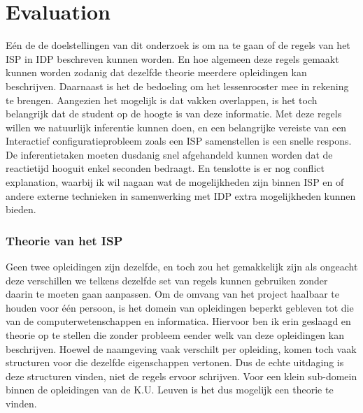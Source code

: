 \chapter{Evaluation}
\label{cha:evaluation}
E\'{e}n de de doelstellingen van dit onderzoek is om na te gaan of de regels van het ISP in IDP beschreven kunnen worden. En hoe algemeen deze regels gemaakt kunnen worden zodanig dat dezelfde theorie meerdere opleidingen kan beschrijven. Daarnaast is het de bedoeling om het lessenrooster mee in rekening te brengen. Aangezien het mogelijk is dat vakken overlappen, is het toch belangrijk dat de student op de hoogte is van deze informatie. Met deze regels willen we natuurlijk inferentie kunnen doen, en een belangrijke vereiste van een Interactief configuratieprobleem zoals een ISP samenstellen is een snelle respons. De inferentietaken moeten dusdanig snel afgehandeld kunnen worden dat de reactietijd hooguit enkel seconden bedraagt. En tenslotte is er nog conflict explanation, waarbij ik wil nagaan wat de mogelijkheden zijn binnen ISP en of andere externe technieken \cite{amilhastre2002consistency} in samenwerking met IDP extra mogelijkheden kunnen bieden. 

\subsection{Theorie van het ISP}
Geen twee opleidingen zijn dezelfde, en toch zou het gemakkelijk zijn als ongeacht deze verschillen we telkens dezelfde set van regels kunnen gebruiken zonder daarin te moeten gaan aanpassen. Om de omvang van het project haalbaar te houden voor \'{e}\'{e}n persoon, is het domein van opleidingen beperkt gebleven tot die van de computerwetenschappen en informatica. Hiervoor ben ik erin geslaagd en theorie op te stellen die zonder probleem eender welk van deze opleidingen kan beschrijven. Hoewel de naamgeving vaak verschilt per opleiding, komen toch vaak structuren voor die dezelfde eigenschappen vertonen. Dus de echte uitdaging is deze structuren vinden, niet de regels ervoor schrijven. Voor een klein sub-domein binnen de opleidingen van de K.U. Leuven is het dus mogelijk een theorie te vinden. 

